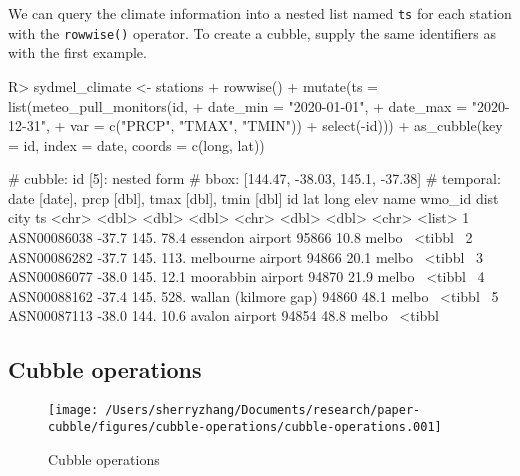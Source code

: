 \documentclass[
]{jss}
\begin{document}
We can query the climate information into a nested list named
\texttt{ts} for each station with the \texttt{rowwise()} operator. To
create a cubble, supply the same identifiers as with the first example.

\begin{CodeChunk}
\begin{CodeInput}
R> sydmel_climate <- stations %
+   rowwise() %
+   mutate(ts = list(meteo_pull_monitors(id, 
+                                        date_min = "2020-01-01", 
+                                        date_max = "2020-12-31",
+                                        var = c("PRCP", "TMAX", "TMIN")) %
+                      select(-id))) %
+   as_cubble(key = id, index = date, coords = c(long, lat))
\end{CodeInput}
\end{CodeChunk}

\begin{CodeChunk}
\begin{CodeOutput}
# cubble:   id [5]: nested form
# bbox:     [144.47, -38.03, 145.1, -37.38]
# temporal: date [date], prcp [dbl], tmax [dbl], tmin [dbl]
  id            lat  long  elev name                 wmo_id  dist city   ts     
  <chr>       <dbl> <dbl> <dbl> <chr>                 <dbl> <dbl> <chr>  <list> 
1 ASN00086038 -37.7  145.  78.4 essendon airport      95866  10.8 melbo~ <tibbl~
2 ASN00086282 -37.7  145. 113.  melbourne airport     94866  20.1 melbo~ <tibbl~
3 ASN00086077 -38.0  145.  12.1 moorabbin airport     94870  21.9 melbo~ <tibbl~
4 ASN00088162 -37.4  145. 528.  wallan (kilmore gap)  94860  48.1 melbo~ <tibbl~
5 ASN00087113 -38.0  144.  10.6 avalon airport        94854  48.8 melbo~ <tibbl~
\end{CodeOutput}
\end{CodeChunk}

\newpage

\hypertarget{cubble-operations}{%
\subsection{Cubble operations}\label{cubble-operations}}

\begin{CodeChunk}
\begin{figure}

{\centering \texttt{[image: /Users/sherryzhang/Documents/research/paper-cubble/figures/cubble-operations/cubble-operations.001]} 

}

\caption[Cubble operations]{Cubble operations}\label{fig:cubble-operations}
\end{figure}
\end{CodeChunk}
\end{document}
